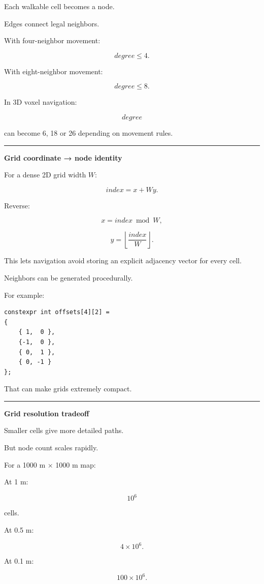 Each walkable cell becomes a node.

Edges connect legal neighbors.

With four-neighbor movement:

\[
degree\le4.
\]

With eight-neighbor movement:

\[
degree\le8.
\]

In 3D voxel navigation:

\[
degree
\]

can become 6, 18 or 26 depending on movement rules.

\begin{center}\rule{0.5\linewidth}{0.5pt}\end{center}

\textbf{Grid coordinate → node identity}

For a dense 2D grid width \(W\):

\[
index=x+Wy.
\]

Reverse:

\[
x=index\bmod W,
\]

\[
y=\left\lfloor
\frac{index}{W}
\right\rfloor.
\]

This lets navigation avoid storing an explicit adjacency vector for every cell.

Neighbors can be generated procedurally.

For example:

\begin{verbatim}
constexpr int offsets[4][2] =
{
    { 1,  0 },
    {-1,  0 },
    { 0,  1 },
    { 0, -1 }
};
\end{verbatim}

That can make grids extremely compact.

\begin{center}\rule{0.5\linewidth}{0.5pt}\end{center}

\textbf{Grid resolution tradeoff}

Smaller cells give more detailed paths.

But node count scales rapidly.

For a 1000 m × 1000 m map:

At 1 m:

\[
10^6
\]

cells.

At 0.5 m:

\[
4\times10^6.
\]

At 0.1 m:

\[
100\times10^6.
\]

